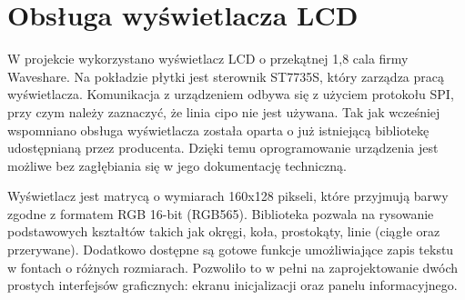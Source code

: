 \section{Obsługa wyświetlacza LCD}
W projekcie wykorzystano wyświetlacz LCD o przekątnej 1,8 cala firmy Waveshare. Na pokładzie płytki jest sterownik ST7735S, który zarządza pracą wyświetlacza. Komunikacja z urządzeniem odbywa się z użyciem protokołu SPI, przy czym należy zaznaczyć, że linia \gls{cipo} nie jest używana. Tak jak wcześniej wspomniano obsługa wyświetlacza została oparta o już istniejącą bibliotekę udostępnianą przez producenta. Dzięki temu oprogramowanie urządzenia jest możliwe bez zagłębiania się w jego dokumentację techniczną. 

Wyświetlacz jest matrycą o wymiarach 160x128 pikseli, które przyjmują barwy zgodne z formatem RGB 16-bit (RGB565). Biblioteka pozwala na rysowanie podstawowych kształtów takich jak okręgi, koła, prostokąty, linie (ciągłe oraz przerywane). Dodatkowo dostępne są gotowe funkcje umożliwiające zapis tekstu w fontach o różnych rozmiarach. Pozwoliło to w pełni na zaprojektowanie dwóch prostych interfejsów graficznych: ekranu inicjalizacji oraz panelu informacyjnego. 

